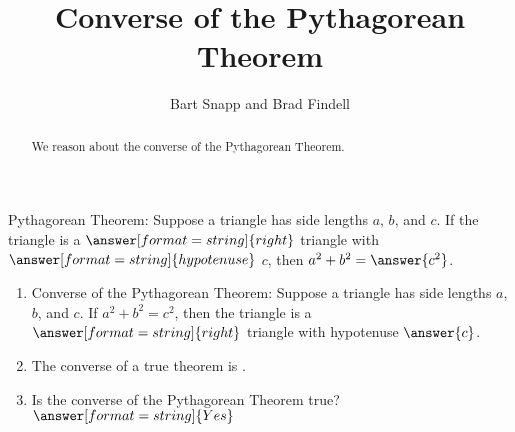 \documentclass[nooutcomes,noauthor]{ximera}
\title{Converse of the Pythagorean Theorem}
\author{Bart Snapp and Brad Findell}
\begin{document}
\begin{abstract}
  We reason about the converse of the Pythagorean Theorem.
\end{abstract}
\maketitle


\begin{problem}

  
Pythagorean Theorem: Suppose a triangle has side lengths $a$, $b$, and $c$.  If the triangle is a $\answer[format=string]{right}$ triangle with $\answer[format=string]{hypotenuse}$ $c$, then $a^2+b^2=\answer{c^2}$.  

\begin{problem}

\begin{enumerate}

\item Converse of the Pythagorean Theorem:  Suppose a triangle has side lengths $a$, $b$, and $c$.  If $a^2+b^2=c^2$, then the triangle is a $\answer[format=string]{right}$ triangle with hypotenuse $\answer{c}$.  

\item The converse of a true theorem is .  

\item Is the converse of the Pythagorean Theorem true?  $\answer[format=string]{Yes}$
\end{enumerate}
\end{problem}
\end{problem}
\end{document}
